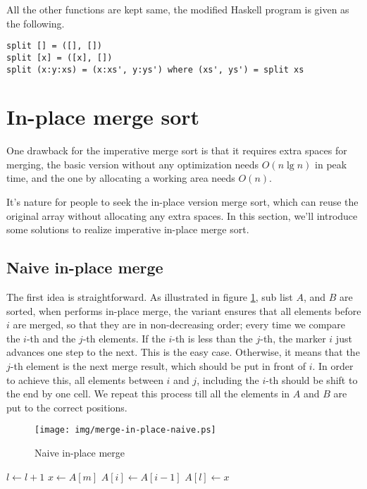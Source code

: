 \documentclass[UTF8]{article}
\begin{document}
All the other functions are kept same, the modified Haskell program is given as the following.

\lstset{language=Haskell}
\begin{lstlisting}
split [] = ([], [])
split [x] = ([x], [])
split (x:y:xs) = (x:xs', y:ys') where (xs', ys') = split xs
\end{lstlisting}

\section{In-place merge sort}
One drawback for the imperative merge sort is that it requires extra spaces for merging, the basic version without
any optimization needs $O(n \lg n)$ in peak time, and the one by allocating a working area needs $O(n)$.

It's nature for people to seek the in-place version merge sort, which can reuse the original array without allocating
any extra spaces. In this section, we'll introduce some solutions to realize imperative in-place merge sort.

\subsection{Naive in-place merge}
The first idea is straightforward. As illustrated in figure \ref{fig:merge-in-place-naive}, sub list $A$, and $B$
are sorted, when performs in-place merge, the variant ensures that all elements before $i$ are merged, so that
they are in non-decreasing order; every time we compare the $i$-th and the $j$-th elements. If the $i$-th is less
than the $j$-th, the marker $i$ just advances one step to the next. This is the easy case. Otherwise, it
means that the $j$-th element is the next merge result, which should be put in front of $i$. In order
to achieve this, all elements between $i$ and $j$, including the $i$-th should be shift to the end by one cell.
We repeat this process till all the elements in $A$ and $B$ are put to the correct positions.

\begin{figure}[htbp]
 \centering
 \texttt{[image: img/merge-in-place-naive.ps]}
 \caption{Naive in-place merge}
 \label{fig:merge-in-place-naive}
\end{figure}

\begin{algorithmic}[1]
      \State $l \gets l + 1$
    \Else
      \State $x \gets A[m]$
       
        \State $A[i] \gets A[i-1]$
      \EndFor
      \State $A[l] \gets x$
    \EndIf
  \EndWhile
\EndProcedure
\end{algorithmic}
\end{document}
